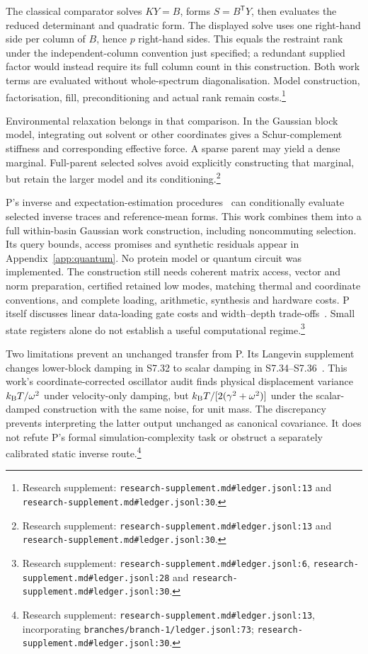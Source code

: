 \documentclass{article}
\begin{document}
The classical comparator solves \(KY=B\), forms \(S=B^{\mathsf T}Y\), then evaluates the reduced determinant and quadratic form. The displayed solve uses one right-hand side per column of \(B\), hence \(p\) right-hand sides. This equals the restraint rank under the independent-column convention just specified; a redundant supplied factor would instead require its full column count in this construction. Both work terms are evaluated without whole-spectrum diagonalisation. Model construction, factorisation, fill, preconditioning and actual rank remain costs.\footnote{Research supplement: \nolinkurl{research-supplement.md#ledger.jsonl:13} and \nolinkurl{research-supplement.md#ledger.jsonl:30}.}

Environmental relaxation belongs in that comparison. In the Gaussian block model, integrating out solvent or other coordinates gives a Schur-complement stiffness and corresponding effective force. A sparse parent may yield a dense marginal. Full-parent selected solves avoid explicitly constructing that marginal, but retain the larger model and its conditioning.\footnote{Research supplement: \nolinkurl{research-supplement.md#ledger.jsonl:13} and \nolinkurl{research-supplement.md#ledger.jsonl:30}.}

P's inverse and expectation-estimation procedures~\cite{P} can conditionally evaluate selected inverse traces and reference-mean forms. This work combines them into a full within-basin Gaussian work construction, including noncommuting selection. Its query bounds, access promises and synthetic residuals appear in Appendix~\ref{app:quantum}. No protein model or quantum circuit was implemented. The construction still needs coherent matrix access, vector and norm preparation, certified retained low modes, matching thermal and coordinate conventions, and complete loading, arithmetic, synthesis and hardware costs. P itself discusses linear data-loading gate costs and width--depth trade-offs~\cite{P}. Small state registers alone do not establish a useful computational regime.\footnote{Research supplement: \nolinkurl{research-supplement.md#ledger.jsonl:6}, \nolinkurl{research-supplement.md#ledger.jsonl:28} and \nolinkurl{research-supplement.md#ledger.jsonl:30}.}

Two limitations prevent an unchanged transfer from P. Its Langevin supplement changes lower-block damping in S7.32 to scalar damping in S7.34--S7.36~\cite{P}. This work's coordinate-corrected oscillator audit finds physical displacement variance \(k_{\rm B}T/\omega^2\) under velocity-only damping, but \(k_{\rm B}T/[2(\gamma^2+\omega^2)]\) under the scalar-damped construction with the same noise, for unit mass. The discrepancy prevents interpreting the latter output unchanged as canonical covariance. It does not refute P's formal simulation-complexity task or obstruct a separately calibrated static inverse route.\footnote{Research supplement: \nolinkurl{research-supplement.md#ledger.jsonl:13}, incorporating \nolinkurl{branches/branch-1/ledger.jsonl:73}; \nolinkurl{research-supplement.md#ledger.jsonl:30}.}
\end{document}
